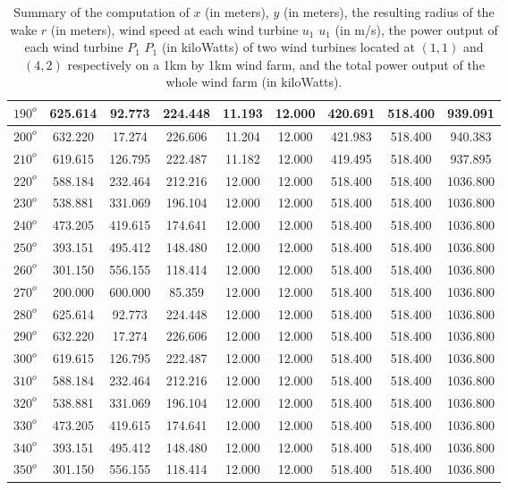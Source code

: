 \begin{table}[H]
\begin{tabular}{|c|c|c|c|c|c|c|c|c|}
$190^o$	&625.614	&92.773	&224.448	&11.193	&12.000	&420.691	&518.400	&939.091 \\ \hline
$200^o$	&632.220	&17.274	&226.606	&11.204	&12.000	&421.983	&518.400	&940.383 \\ \hline
$210^o$	&619.615	&126.795	&222.487	&11.182	&12.000	&419.495	&518.400	&937.895 \\ \hline
$220^o$	&588.184	&232.464	&212.216	&12.000	&12.000	&518.400	&518.400	&1036.800 \\ \hline
$230^o$	&538.881	&331.069	&196.104	&12.000	&12.000	&518.400	&518.400	&1036.800 \\ \hline
$240^o$	&473.205	&419.615	&174.641	&12.000	&12.000	&518.400	&518.400	&1036.800 \\ \hline
$250^o$	&393.151	&495.412	&148.480	&12.000	&12.000	&518.400	&518.400	&1036.800 \\ \hline
$260^o$	&301.150	&556.155	&118.414	&12.000	&12.000	&518.400	&518.400	&1036.800 \\ \hline
$270^o$	&200.000	&600.000	&85.359	&12.000	&12.000	&518.400	&518.400	&1036.800 \\ \hline
$280^o$	&625.614	&92.773	&224.448	&12.000	&12.000	&518.400	&518.400	&1036.800 \\ \hline
$290^o$	&632.220	&17.274	&226.606	&12.000	&12.000	&518.400	&518.400	&1036.800 \\ \hline
$300^o$	&619.615	&126.795	&222.487	&12.000	&12.000	&518.400	&518.400	&1036.800 \\ \hline
$310^o$	&588.184	&232.464	&212.216	&12.000	&12.000	&518.400	&518.400	&1036.800 \\ \hline
$320^o$	&538.881	&331.069	&196.104	&12.000	&12.000	&518.400	&518.400	&1036.800 \\ \hline
$330^o$	&473.205	&419.615	&174.641	&12.000	&12.000	&518.400	&518.400	&1036.800 \\ \hline
$340^o$	&393.151	&495.412	&148.480	&12.000	&12.000	&518.400	&518.400	&1036.800 \\ \hline
$350^o$	&301.150	&556.155	&118.414	&12.000	&12.000	&518.400	&518.400	&1036.800 \\ \hline
        \end{tabular}
        \caption{Summary of the computation of $x$ (in meters), $y$ (in meters), the resulting radius of the wake $r$ (in meters), wind speed at each wind turbine $u_1$ $u_1$ (in m/s), the power output of each wind turbine $P_1$ $P_1$ (in kiloWatts) of two wind turbines located at $(1,1)$ and $(4,2)$ respectively on a 1km by 1km wind farm, and the total power output of the whole wind farm (in kiloWatts).}
        \label{summaryAvg3}
    \end{table}
    \doublespacing
    
